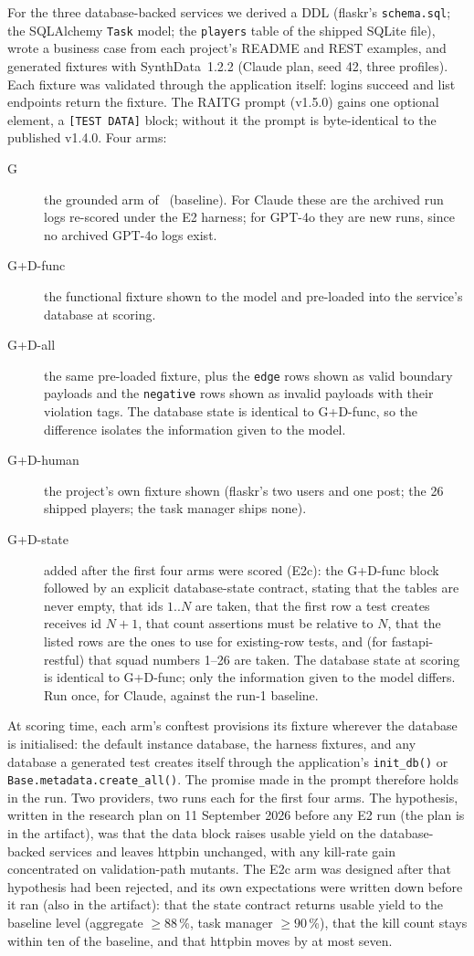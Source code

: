 \documentclass[preprint,12pt]{elsarticle}
\begin{document}
For the three database-backed services we derived a DDL (flaskr's \texttt{schema.sql}; the SQLAlchemy \texttt{Task} model; the \texttt{players} table of the shipped SQLite file), wrote a business case from each project's README and REST examples, and generated fixtures with SynthData~1.2.2 (Claude plan, seed 42, three profiles). Each fixture was validated through the application itself: logins succeed and list endpoints return the fixture. The RAITG prompt (v1.5.0) gains one optional element, a \texttt{[TEST DATA]} block; without it the prompt is byte-identical to the published v1.4.0. Four arms:
\begin{description}
\item[G] the grounded arm of~\cite{javvadi2026raitg} (baseline). For Claude these are the archived run logs re-scored under the E2 harness; for GPT-4o they are new runs, since no archived GPT-4o logs exist.
\item[G+D-func] the functional fixture shown to the model and pre-loaded into the service's database at scoring.
\item[G+D-all] the same pre-loaded fixture, plus the \texttt{edge} rows shown as valid boundary payloads and the \texttt{negative} rows shown as invalid payloads with their violation tags. The database state is identical to G+D-func, so the difference isolates the information given to the model.
\item[G+D-human] the project's own fixture shown (flaskr's two users and one post; the 26 shipped players; the task manager ships none).
\item[G+D-state] added after the first four arms were scored (E2c): the G+D-func block followed by an explicit database-state contract, stating that the tables are never empty, that ids $1..N$ are taken, that the first row a test creates receives id $N+1$, that count assertions must be relative to $N$, that the listed rows are the ones to use for existing-row tests, and (for fastapi-restful) that squad numbers 1--26 are taken. The database state at scoring is identical to G+D-func; only the information given to the model differs. Run once, for Claude, against the run-1 baseline.
\end{description}
At scoring time, each arm's conftest provisions its fixture wherever the database is initialised: the default instance database, the harness fixtures, and any database a generated test creates itself through the application's \texttt{init\_db()} or \texttt{Base.metadata.create\_all()}. The promise made in the prompt therefore holds in the run. Two providers, two runs each for the first four arms. The hypothesis, written in the research plan on 11 September 2026 before any E2 run (the plan is in the artifact), was that the data block raises usable yield on the database-backed services and leaves httpbin unchanged, with any kill-rate gain concentrated on validation-path mutants. The E2c arm was designed after that hypothesis had been rejected, and its own expectations were written down before it ran (also in the artifact): that the state contract returns usable yield to the baseline level (aggregate $\ge 88$\,\%, task manager $\ge 90$\,\%), that the kill count stays within ten of the baseline, and that httpbin moves by at most seven.
\end{document}

